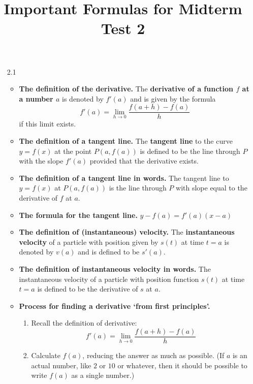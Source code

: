 \documentclass{article}
\title{Important Formulas for Midterm Test 2}
\author{\commonAuthor}
\date{\commonDateMTTwo}
\newcommand{\ds}{\displaystyle}
\begin{document}
\maketitle

\begin{itemize}
\item[2.1]
  \begin{itemize}
  \item \textbf{The definition of the derivative.}
    The \textbf{derivative of a function $f$ at a
    number $a$} is denoted by $f'(a)$ and is given by the formula
    \begin{displaymath}
      f'(a) = \lim_{h\to 0} \frac{f(a+h)-f(a)}{h}
    \end{displaymath}
    if this limit exists.
  \item \textbf{The definition of a tangent line.}
    The \textbf{tangent line} to the curve
    $y=f(x)$ at the point $P(a,f(a))$ is 
    defined to be the line through $P$
    with the slope $f'(a)$ provided that the derivative exists.
  \item \textbf{The definition of a tangent line in words.}
    The tangent line to $y=f(x)$ at $P(a,f(a))$ 
    is the line through $P$ with slope
    equal to the derivative of $f$ at $a$.
  \item \textbf{The formula for the tangent line.} $\ds y-f(a) = f'(a) (x-a)$
  \item \textbf{The definition of (instantaneous) velocity.}
    The \textbf{instantaneous velocity} of a particle
    with position given by $s(t)$ at time $t=a$ is denoted by $v(a)$
    and is defined to be $s'(a)$.
  \item \textbf{The definition of instantaneous velocity in words.}
    The instantaneous velocity of a particle with position function $s(t)$
    at time $t=a$ is defined to be the derivative of $s$ at $a$.
  \item \textbf{Process for finding a derivative `from first principles'.}
    \begin{enumerate}
    \item Recall the definition of derivative:
      \begin{displaymath}
        f'(a) = \lim_{h\to 0} \frac{f(a+h)-f(a)}{h}
      \end{displaymath}
    \item Calculate $f(a)$, reducing the answer as much as possible.  (If
      $a$ is an actual number, like $2$ or $10$ or whatever, then it should
      be possible to write $f(a)$ as a single number.)

\end{enumerate}
\end{itemize}
\end{itemize}
\end{document}
